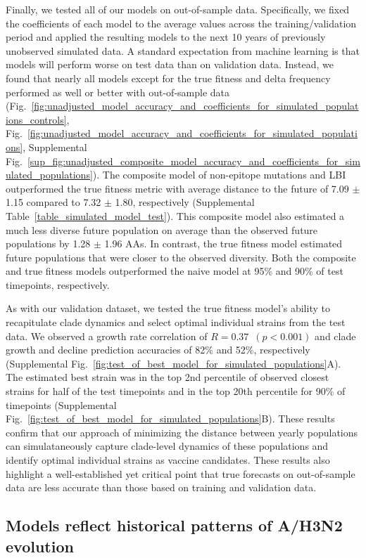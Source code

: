Finally, we tested all of our models on out-of-sample data.
Specifically, we fixed the coefficients of each model to the average values across the training/validation period and applied the resulting models to the next 10 years of previously unobserved simulated data.
A standard expectation from machine learning is that models will perform worse on test data than on validation data.
Instead, we found that nearly all models except for the true fitness and delta frequency performed as well or better with out-of-sample data (Fig.~\ref{fig:unadjusted_model_accuracy_and_coefficients_for_simulated_populations_controls}, Fig.~\ref{fig:unadjusted_model_accuracy_and_coefficients_for_simulated_populations}, Supplemental Fig.~\ref{sup_fig:unadjusted_composite_model_accuracy_and_coefficients_for_simulated_populations}).
The composite model of non-epitope mutations and LBI outperformed the true fitness metric with average distance to the future of 7.09 $\pm$ 1.15 compared to 7.32 $\pm$ 1.80, respectively (Supplemental Table~\ref{table_simulated_model_test}).
This composite model also estimated a much less diverse future population on average than the observed future populations by 1.28 $\pm$ 1.96 AAs.
In contrast, the true fitness model estimated future populations that were closer to the observed diversity.
Both the composite and true fitness models outperformed the naive model at 95\% and 90\% of test timepoints, respectively.

As with our validation dataset, we tested the true fitness model's ability to recapitulate clade dynamics and select optimal individual strains from the test data.
We observed a growth rate correlation of $R = 0.37$~$(p < 0.001)$ and clade growth and decline prediction accuracies of 82\% and 52\%, respectively (Supplemental Fig.~\ref{fig:test_of_best_model_for_simulated_populations}A).
The estimated best strain was in the top 2nd percentile of observed closest strains for half of the test timepoints and in the top 20th percentile for 90\% of timepoints (Supplemental Fig.~\ref{fig:test_of_best_model_for_simulated_populations}B).
These results confirm that our approach of minimizing the distance between yearly populations can simulataneously capture clade-level dynamics of these populations and identify optimal individual strains as vaccine candidates.
These results also highlight a well-established yet critical point that true forecasts on out-of-sample data are less accurate than those based on training and validation data.

\subsection*{Models reflect historical patterns of A/H3N2 evolution}

